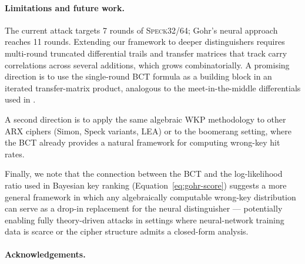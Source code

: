 \documentclass[runningheads]{llncs}
\newcommand{\speck}{\textsc{Speck}32/64}
\begin{document}
\paragraph{Limitations and future work.}

The current attack targets 7 rounds of \speck{}; Gohr's neural approach
reaches 11 rounds.  Extending our framework to deeper distinguishers
requires multi-round truncated differential trails and transfer matrices
that track carry correlations across several additions, which grows
combinatorially.  A promising direction is to use the single-round BCT
formula as a building block in an iterated transfer-matrix product,
analogous to the meet-in-the-middle differentials used in
\cite{ALLW14,BLY23}.

A second direction is to apply the same algebraic WKP methodology to
other ARX ciphers (Simon, Speck variants, LEA) or to the boomerang
setting, where the BCT already provides a natural framework for
computing wrong-key hit rates.

Finally, we note that the connection between the BCT and the log-likelihood
ratio used in Bayesian key ranking (Equation~\eqref{eq:gohr-score}) suggests a
more general framework in which any algebraically computable wrong-key
distribution can serve as a drop-in replacement for the neural
distinguisher — potentially enabling fully theory-driven attacks in
settings where neural-network training data is scarce or the cipher
structure admits a closed-form analysis.

\paragraph{Acknowledgements.}



\end{document}
